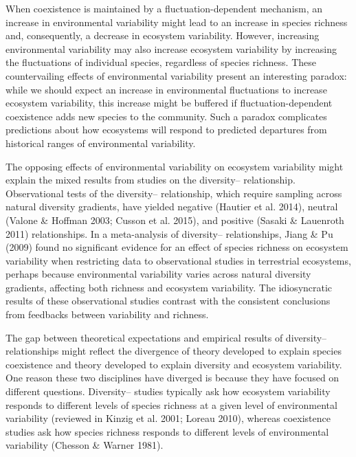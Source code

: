 \documentclass[12pt,]{article}
\begin{document}
When coexistence is maintained by a fluctuation-dependent mechanism, an
increase in environmental variability might lead to an increase in
species richness and, consequently, a decrease in ecosystem variability.
However, increasing environmental variability may also increase
ecosystem variability by increasing the fluctuations of individual
species, regardless of species richness. These countervailing effects of
environmental variability present an interesting paradox: while we
should expect an increase in environmental fluctuations to increase
ecosystem variability, this increase might be buffered if
fluctuation-dependent coexistence adds new species to the community.
Such a paradox complicates predictions about how ecosystems will respond
to predicted departures from historical ranges of environmental
variability.

The opposing effects of environmental variability on ecosystem
variability might explain the mixed results from 
studies on the diversity-- relationship.
Observational tests of the diversity--
relationship, which require sampling across natural diversity gradients,
have yielded negative (Hautier et al. 2014), neutral (Valone \& Hoffman
2003; Cusson et al. 2015), and positive (Sasaki \& Lauenroth 2011)
relationships. In a meta-analysis of
diversity-- relationships, Jiang \& Pu (2009)
found no significant evidence for an effect of species richness on
ecosystem variability when restricting data to observational studies in
terrestrial ecosystems, perhaps because environmental variability varies
across natural diversity gradients, affecting both richness and
ecosystem variability. The idiosyncratic results of these observational
studies contrast with the consistent conclusions from
feedbacks between variability and richness.

The gap between theoretical expectations and empirical results of
diversity-- relationships might reflect the
divergence of theory developed to explain species coexistence and theory
developed to explain diversity and ecosystem variability.
One reason these two disciplines have diverged is because they have
focused on different questions. Diversity--
studies typically ask how ecosystem variability responds to different
levels of species richness at a given level of environmental variability
(reviewed in Kinzig et al. 2001; Loreau 2010), whereas coexistence
studies ask how species richness responds to different levels of
environmental variability (Chesson \& Warner 1981).
\end{document}
